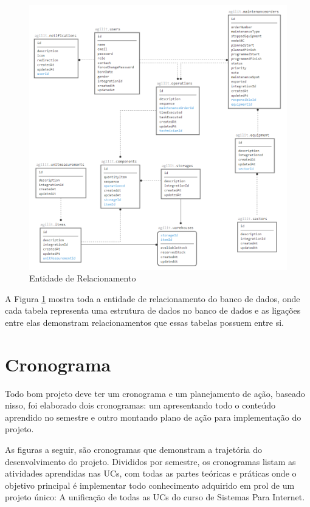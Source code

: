 \newpage
\begin{figure}[htb]
	\caption{\label{entidade_relacionamento}Entidade de Relacionamento}
	\begin{center}
		\includegraphics[scale=0.70]{./Figuras/er3.png}
	\end{center}
\end{figure}

A Figura \ref{entidade_relacionamento} mostra toda a entidade de relacionamento do banco de dados, onde cada tabela representa uma estrutura de dados no banco de dados e as ligações entre elas demonstram relacionamentos que essas tabelas possuem entre si.


\newpage
\section{Cronograma}
Todo bom projeto deve ter um cronograma e um planejamento de ação, baseado nisso, foi elaborado dois cronogramas: um apresentando todo o conteúdo aprendido no semestre e outro montando plano de ação para implementação do projeto.

As figuras a seguir, são cronogramas que demonstram a trajetória do desenvolvimento do projeto. Divididos por semestre, os cronogramas listam as atividades aprendidas nas UCs, com todas as partes teóricas e práticas onde o objetivo principal é implementar todo conhecimento adquirido em prol de um projeto único: A unificação de todas as UCs do curso de Sistemas Para Internet.

